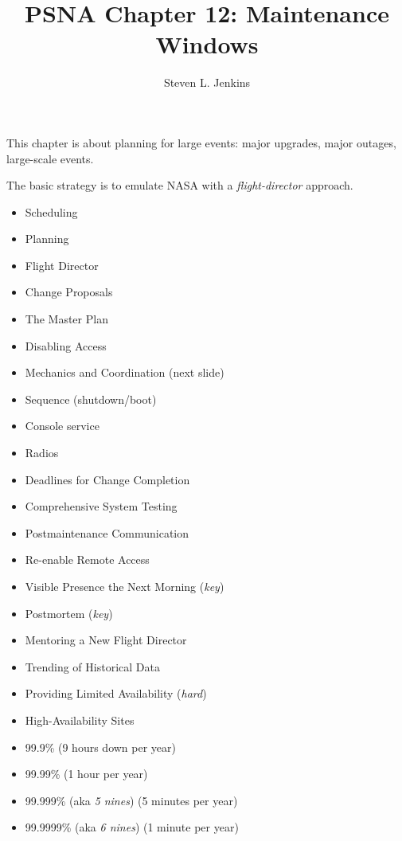 \documentclass{slides}
\title{PSNA Chapter 12: Maintenance Windows}
\author{Steven L. Jenkins}
\newcommand{\bi}{\begin{itemize}}
\newcommand{\ei}{\end{itemize}}
\begin{document}

This chapter is about planning for large events: major upgrades,
major outages, large-scale events.

The basic strategy is to emulate NASA with a 
\emph{flight-director} approach.


\bi
\item Scheduling
\item Planning
\item Flight Director
\item Change Proposals
\item The Master Plan
\item Disabling Access
\item Mechanics and Coordination (next slide)
\ei


\bi
\item Sequence (shutdown/boot)
\item Console service
\item Radios
\ei


\bi
\item Deadlines for Change Completion
\item Comprehensive System Testing
\item Postmaintenance Communication
\item Re-enable Remote Access
\item Visible Presence the Next Morning (\emph{key})
\item Postmortem (\emph{key})
\ei
 

\bi
\item Mentoring a New Flight Director
\item Trending of Historical Data
\item Providing Limited Availability (\emph{hard})
\item High-Availability Sites
\ei


\bi
\item 99.9\% (9 hours down per year)
\item 99.99\% (1 hour per year)
\item 99.999\% (aka \emph{5 nines}) (5 minutes per year)
\item 99.9999\% (aka \emph{6 nines}) (1 minute per year)
\ei
\end{document}
